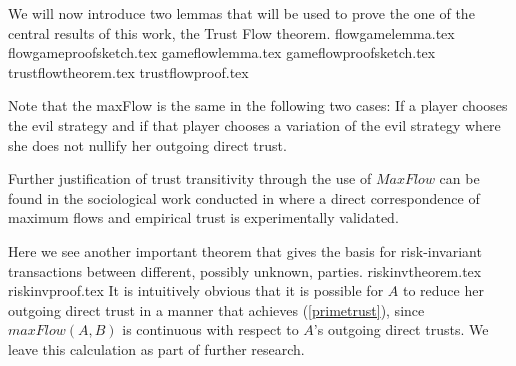   We will now introduce two lemmas that will be used to prove the one of the central results of this work, the Trust Flow
  theorem.
  {flowgamelemma.tex}
  {flowgameproofsketch.tex}
  {gameflowlemma.tex}
  {gameflowproofsketch.tex}
  {trustflowtheorem.tex}
  {trustflowproof.tex}

  Note that the maxFlow is the same in the following two cases: If a player chooses the evil strategy and if that player
  chooses a variation of the evil strategy where she does not nullify her outgoing direct trust.

  Further justification of trust transitivity through the use of $MaxFlow$ can be found in the sociological work conducted in
  \cite{kmrs} where a direct correspondence of maximum flows and empirical trust is experimentally validated.

  Here we see another important theorem that gives the basis for risk-invariant transactions between different, possibly
  unknown, parties.
  {riskinvtheorem.tex}
  {riskinvproof.tex}
  It is intuitively obvious that it is possible for $A$ to reduce her outgoing direct trust in a manner that achieves
  (\ref{primetrust}), since $maxFlow\left(A, B\right)$ is continuous with respect to $A$'s outgoing direct trusts. We
  leave this calculation as part of further research.
